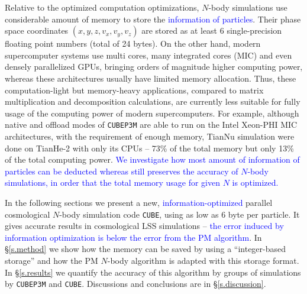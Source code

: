 \documentclass[10pt,twocolumn,preprint]{emulateapj}
\newcommand{\tcb}{\textcolor{blue}}
\begin{document}
Relative to the optimized computation optimizations, $N$-body simulations use considerable amount of memory to store the \tcb{information of particles}. Their phase space coordinates $(x,y,z,v_x,v_y,v_z)$ are stored as at least 6 single-precision floating point numbers (total of 24 bytes). On the other hand, modern supercomputer systems use multi cores, many integrated cores (MIC) and even densely parallelized GPUs, bringing orders of magnitude higher computing power, whereas these architectures usually have limited memory allocation. Thus, these computation-light but memory-heavy applications, compared to matrix multiplication and decomposition calculations, are currently less suitable for fully usage of the computing power of modern supercomputers. For example, although native and offload modes of {\tt CUBEP3M} are able to run on the Intel Xeon-PHI MIC architectures, with the requirement of enough memory, TianNu simulation were done on TianHe-2 with only its CPUs -- 73\% of the total memory but only 13\% of the total computing power. \tcb{We investigate how most amount of information of particles can be deducted whereas still preserves the accuracy of $N$-body simulations, in order that the total memory usage for given $N$ is optimized.}

In the following sections we present a new, \tcb{information-optimized} parallel cosmological $N$-body simulation code {\tt CUBE}, using as low as 6 byte per particle. It gives accurate results in cosmological LSS simulations -- \tcb{the error induced by information optimization is below the error from the PM algorithm}. In \S\ref{s.method} we show how the memory can be saved by using a ``integer-based storage'' and how the PM $N$-body algorithm is adapted with this storage format. In \S\ref{s.results} we quantify the accuracy of this algorithm by groups of simulations by {\tt CUBEP3M} and {\tt CUBE}. Discussions and conclusions are in \S\ref{s.discussion}.
\end{document}
